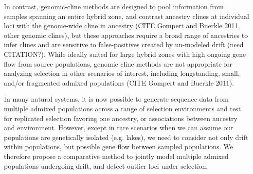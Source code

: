 \documentclass[12pt]{report}
\begin{document}
In contrast, genomic-cline methods are designed to pool information from samples spanning an entire hybrid zone, and contrast ancestry clines at individual loci with the genome-wide cline in ancestry (CITE Gompert and Buerkle 2011, other genomic clines), but these approaches require a broad range of ancestries to infer clines and are sensitive to false-positives created by un-modeled drift (need CITATION?). While ideally suited for large hybrid zones with high ongoing gene flow from source populations, genomic cline methods are not appropriate for analyzing selection in other scenarios of interest, including longstanding, small, and/or fragmented admixed populations (CITE Gompert and Buerkle 2011). 

In many natural systems, it is now possible to generate sequence data from multiple admixed populations across a range of selection environments and test for replicated selection favoring one ancestry, or associations between ancestry and environment. However, except in rare scenarios when we can assume our populations are genetically isolated (e.g. lakes), we need to consider not only drift within populations, but possible gene flow between sampled populations. We therefore propose a comparative method to jointly model multiple admixed populations undergoing drift, and detect outlier loci under selection.
\end{document}
